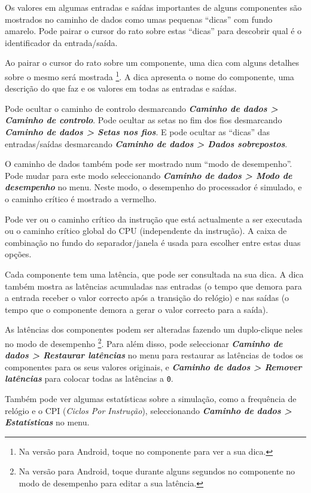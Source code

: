 \documentclass[11pt,a4paper,twoside,titlepage]{article}
\newcommand{\menupath}[1]{\textbf{\emph{#1}}}
\begin{document}
Os valores em algumas entradas e saídas importantes de alguns componentes são
mostrados no caminho de dados como umas pequenas ``dicas'' com 
fundo amarelo.
Pode pairar o cursor do rato sobre estas ``dicas'' para descobrir qual é o
identificador da entrada/saída.

Ao pairar o cursor do rato sobre um componente, uma dica com alguns detalhes
sobre o mesmo será mostrada \footnote{Na versão para Android, toque no
componente para ver a sua dica.}.
A dica apresenta o nome do componente, uma descrição do que faz e os valores
em todas as entradas e saídas.

Pode ocultar o caminho de controlo desmarcando
\menupath{Caminho de dados > Caminho de controlo}.
Pode ocultar as setas no fim dos fios desmarcando
\menupath{Caminho de dados > Setas nos fios}.
E pode ocultar as ``dicas'' das entradas/saídas desmarcando
\menupath{Caminho de dados > Dados sobrepostos}.

\bigskip

O caminho de dados também pode ser mostrado num ``modo de desempenho''.
Pode mudar para este modo seleccionando 
\menupath{Caminho de dados > Modo de desempenho} no menu.
Neste modo, o desempenho do processador é simulado, e o caminho crítico
é mostrado a vermelho.

Pode ver ou o caminho crítico da instrução que está actualmente a ser
executada ou o caminho crítico global do CPU (independente da instrução).
A caixa de combinação no fundo do separador/janela é usada para escolher
entre estas duas opções.

Cada componente tem uma latência, que pode ser consultada na sua dica.
A dica também mostra as latências acumuladas nas entradas (o tempo que
demora para a entrada receber o valor correcto após a transição do relógio)
e nas saídas (o tempo que o componente demora a gerar o valor correcto para
a saída).

As latências dos componentes podem ser alteradas fazendo um duplo-clique
neles no modo de desempenho \footnote{Na versão para Android, toque durante
alguns segundos no componente no modo de desempenho para editar a sua
latência.}.
Para além disso, pode seleccionar 
\menupath{Caminho de dados > Restaurar latências} no menu para restaurar as
latências de todos os componentes para os seus valores originais, e
\menupath{Caminho de dados > Remover latências} para colocar todas as
latências a \verb+0+.

Também pode ver algumas estatísticas sobre a simulação, como a frequência de
relógio e o CPI (\emph{Ciclos Por Instrução}), seleccionando
\menupath{Caminho de dados > Estatísticas} no menu.
\end{document}
